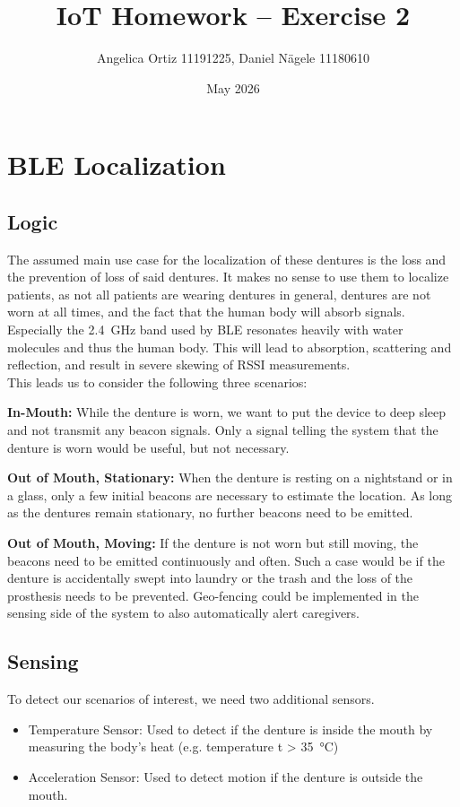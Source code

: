 \documentclass[a4paper,12pt]{article}
\title{IoT Homework -- Exercise 2}
\author{Angelica Ortiz 11191225, Daniel Nägele 11180610}
\date{May 2026}
\begin{document}
\maketitle
\thispagestyle{empty}
\newpage

\section{BLE Localization}
\subsection{Logic}
The assumed main use case for the localization of these dentures is the loss and the prevention of loss of said dentures. It makes no sense to use them to localize patients, as not all patients are wearing dentures in general, dentures are not worn at all times, and the fact that the human body will absorb signals. Especially the \SI{2.4}{\giga\hertz} band used by BLE resonates heavily with water molecules and thus the human body. This will lead to absorption, scattering and reflection, and result in severe skewing of RSSI measurements.\\
This leads us to consider the following three scenarios:
\vspace{5pt}

\noindent\textbf{In-Mouth:} While the denture is worn, we want to put the device to deep sleep and not transmit any beacon signals. Only a signal telling the system that the denture is worn would be useful, but not necessary.

\vspace{5pt}

\noindent\textbf{Out of Mouth, Stationary:} When the denture is resting on a nightstand or in a glass, only a few initial beacons are necessary to estimate the location. As long as the dentures remain stationary, no further beacons need to be emitted.

\vspace{5pt}

\noindent\textbf{Out of Mouth, Moving:} If the denture is not worn but still moving, the beacons need to be emitted continuously and often. Such a case would be if the denture is accidentally swept into laundry or the trash and the loss of the prosthesis needs to be prevented. Geo-fencing could be implemented in the sensing side of the system to also automatically alert caregivers.

\subsection{Sensing}
To detect our scenarios of interest, we need two additional sensors.
\begin{itemize}
	\item Temperature Sensor: Used to detect if the denture is inside the mouth by measuring the body's heat (e.g. temperature t \textgreater{} \SI{35}{\degreeCelsius})
	\item Acceleration Sensor: Used to detect motion if the denture is outside the mouth.
\end{itemize}
\end{document}
